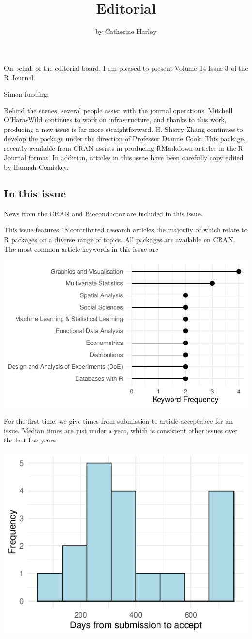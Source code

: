 \title{Editorial}
\author{by Catherine Hurley}

\maketitle


On behalf of the editorial board, I am pleased to present Volume 14 Issue 3 of the R Journal.

\noindent Simon funding:

\noindent Behind the scenes, several people assist with the journal operations. Mitchell O'Hara-Wild continues to work on infrastructure, and thanks to this work, producing a new issue is far more straightforward. H. Sherry Zhang continues to develop the  package under the direction of Professor Dianne Cook. This package, recently available from CRAN assists in producing RMarkdown articles in the R Journal format. In addition, articles in this issue have been carefully copy edited by Hannah Comiskey.

\hypertarget{in-this-issue}{%
\subsection{In this issue}\label{in-this-issue}}

News from the CRAN and Bioconductor are included in this issue.

\noindent This issue features 18 contributed research articles the majority of which relate to R packages
on a diverse range of topics. All packages are available on CRAN. The most common article keywords in this issue are

\begin{center}\includegraphics[width=0.5\linewidth]{figs/keywords-1} \end{center}

\noindent For the first time, we give times from submission to article acceptabce for an issue. Median times are just under a year, which is consistent other issues over the last few years.

\begin{center}\includegraphics[width=0.5\linewidth]{figs/days-1} \end{center}


\address{%
Catherine Hurley\\
Maynooth University\\%
\\
%
\url{https://journal.r-project.org}\\%
%
\href{mailto:r-journal@r-project.org}{\nolinkurl{r-journal@r-project.org}}%
}
